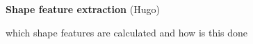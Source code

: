 \textbf{Shape feature extraction}  (Hugo)

which shape features are calculated and how is this done
    
    